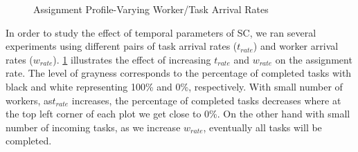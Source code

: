 \begin{figure}[h]
    \centering
    \vspace{-0.15in}
    \caption{\small{Assignment Profile-Varying Worker/Task Arrival Rates}}
    \label{fig:tw_rate}
\end{figure}

In order to study the effect of temporal parameters of SC, we ran several experiments using different pairs of task arrival rates ($t_{rate}$) and worker arrival rates ($w_{rate}$). \cref{fig:tw_rate} illustrates the effect of increasing $t_{rate}$ and $w_{rate}$ on the assignment rate. The level of grayness corresponds to the percentage of completed tasks with black and white representing 100\% and 0\%, respectively. With small number of workers, as$t_{rate}$ increases, the percentage of completed tasks decreases where at the top left corner of each plot we get close to 0\%. On the other hand with small number of incoming tasks, as we increase $w_{rate}$, eventually all tasks will be completed.

